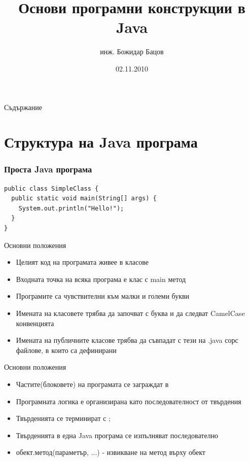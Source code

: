 \documentclass{beamer}
\title{Основи програмни конструкции в Java}
\author{инж. Божидар Бацов}
\institute{Drow Ltd.}
\date{02.11.2010}
\begin{document}
\begin{frame}
  \titlepage
\end{frame}

\begin{frame}{Съдържание}
  \tableofcontents[pausesections]
\end{frame}

\section{Структура на Java програма}

\begin{frame}[fragile]
  \transdissolve
  \frametitle{Проста Java програма}
\begin{lstlisting}
public class SimpleClass {
  public static void main(String[] args) {
    System.out.println("Hello!");
  }
}
\end{lstlisting}
\end{frame}

\begin{frame}{Основни положения}  
  \transdissolve
  \begin{itemize}
  \item Целият код на програмата живее в класове
  \item Входната точка на всяка програма е клас с main метод
  \item Програмите са чувствителни към малки и големи букви
  \item Имената на класовете трябва да започват с буква и да следват
    CamelCase конвенцията
  \item Имената на публичните класове трябва да съвпадат с тези на
    .java сорс файлове, в които са дефинирани
  \end{itemize}
\end{frame}

\begin{frame}{Основни положения}  
  \transdissolve
  \begin{itemize}
  \item Частите(блоковете) на програмата се заграждат в {}
  \item Програмната логика е организирана като последователност от твърдения
  \item Твърденията се терминират с ;
  \item Твърденията в една Java програма се изпълняват последователно
  \item обект.метод(параметър, ...) - извикване на метод върху обект
  \end{itemize}
\end{frame}
\end{document}
